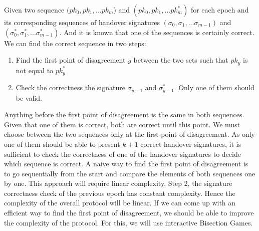 \documentclass[a4paper,11pt,oneside]{article}
\theoremstyle{definition}
\begin{document}
  Given two sequence $(pk_0, pk_1, ... pk_m$) and $(pk_0, pk_1, ... pk_m^*)$ for each epoch and its corresponding sequences of handover signatures $(\sigma_0, \sigma_1, ... \sigma_{m - 1})$ and $(\sigma_0^*, \sigma_1^*, ... \sigma_{m - 1}^*)$. And it is known that one of the sequences is certainly correct. We can find the correct sequence in two steps:
  \begin{enumerate}
  \item Find the first point of disagreement $y$ between the two sets such that $pk_y$ is not equal to $pk_y^*$
  \item Check the correctness the signature $\sigma_{y - 1}$ and $\sigma_{y - 1}^*$. Only one of them should be valid. 
  \end{enumerate}
   Anything before the first point of disagreement is the same in both sequences. Given that one of them is correct, both are correct until this point. We must choose between the two sequences only at the first point of disagreement. As only one of them should be able to present $k + 1$ correct handover signatures, it is sufficient to check the correctness of one of the handover signatures to decide which sequence is correct. A naive way to find the first point of disagreement is to go sequentially from the start and compare the elements of both sequences one by one. This approach will require linear complexity. Step 2, the signature correctness check of the previous epoch has constant complexity. Hence the complexity of the overall protocol will be linear. If we can come up with an efficient way to find the first point of disagreement, we should be able to improve the complexity of the protocol. For this, we will use interactive Bisection Games.
  
\end{document}
